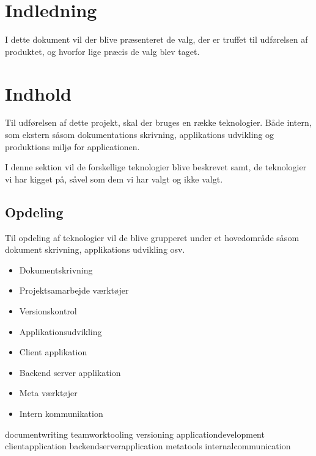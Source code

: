\chapter{Indledning}

I dette dokument vil der blive præsenteret de valg, der er truffet til udførelsen af produktet, og hvorfor lige præcis de valg blev taget.

\chapter{Indhold}

Til udførelsen af dette projekt, skal der bruges en række teknologier. Både intern, som ekstern såsom dokumentations skrivning, applikations udvikling og produktions miljø for applicationen.

I denne sektion vil de forskellige teknologier blive beskrevet samt, de teknologier vi har kigget på, såvel som dem vi har valgt og ikke valgt.

\section{Opdeling}

Til opdeling af teknologier vil de blive grupperet under et hovedområde såsom dokument skrivning, applikations udvikling osv.

\begin{itemize}
    \item Dokumentskrivning
    \item Projektsamarbejde værktøjer
    \item Versionskontrol
    \item Applikationsudvikling
    \item Client applikation
    \item Backend server applikation
    \item Meta værktøjer
    \item Intern kommunikation
\end{itemize}

{documentwriting}
{teamworktooling}
{versioning}
{applicationdevelopment}
{clientapplication}
{backendserverapplication}
{metatools}
{internalcommunication}

